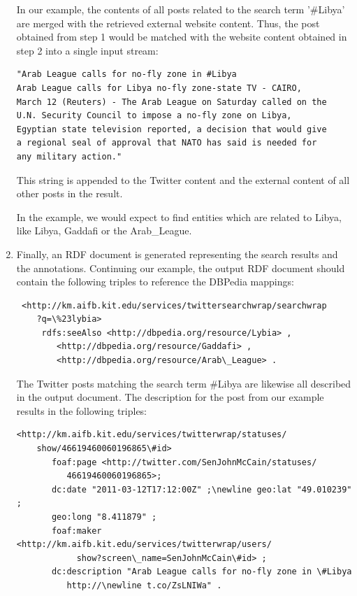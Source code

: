 \documentclass{llncs}
\begin{document}
\begin{enumerate}
In our example, the contents of all posts related to the search term '\#Libya'
are merged with the retrieved external website content. Thus, the post obtained from
step 1 would be matched with the website content obtained in step 2 into a
single input stream:
\begin{verbatim}"Arab League calls for no-fly zone in #Libya
Arab League calls for Libya no-fly zone-state TV - CAIRO, 
March 12 (Reuters) - The Arab League on Saturday called on the 
U.N. Security Council to impose a no-fly zone on Libya, 
Egyptian state television reported, a decision that would give
a regional seal of approval that NATO has said is needed for 
any military action."\end{verbatim}
This string is appended to the Twitter content and the external content of all other posts in the result.

In the example, we would expect to find entities which are related to Libya,
like Libya, Gaddafi or the Arab\_League.

	\item	Finally, an RDF document is generated representing the search results and
	the annotations. Continuing our example, the output RDF document should contain the following
	triples to reference the DBPedia mappings:
	{\small\begin{verbatim}	<http://km.aifb.kit.edu/services/twittersearchwrap/searchwrap
	?q=\%23lybia>
     rdfs:seeAlso <http://dbpedia.org/resource/Lybia> ,
        <http://dbpedia.org/resource/Gaddafi> ,
        <http://dbpedia.org/resource/Arab\_League> .\end{verbatim}}
	The Twitter posts matching the search term \#Libya are likewise all described
	in the output document. The description for the post from our example 
	results in the following triples:
	{\small\begin{verbatim}<http://km.aifb.kit.edu/services/twitterwrap/statuses/
	show/46619460060196865\#id> 
	   foaf:page <http://twitter.com/SenJohnMcCain/statuses/
	      46619460060196865>;
	   dc:date "2011-03-12T17:12:00Z" ;\newline geo:lat "49.010239" ;
	   geo:long "8.411879" ;
	   foaf:maker <http://km.aifb.kit.edu/services/twitterwrap/users/
		    show?screen\_name=SenJohnMcCain\#id> ;
	   dc:description "Arab League calls for no-fly zone in \#Libya 
	      http://\newline t.co/ZsLNIWa" . \end{verbatim}}     
\end{enumerate}
\end{document}
